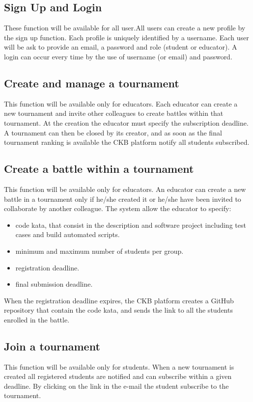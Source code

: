 \subsection{Sign Up and Login}
These function will be available for all user.\newline All users can create a new profile by the sign up function. Each profile is uniquely identified by a username. Each user will be ask to provide an email, a password and role (student or educator). \newline
A login can occur every time by the use of username (or email) and password.

\subsection{Create and manage a tournament}
This function will be available only for educators. \newline
Each educator can create a new tournament and invite other colleagues to create battles within that tournament. At the creation the educator must specify the subscription deadline. 
A tournament can then be closed by its creator, and as soon as the final tournament ranking is available the CKB platform notify all students subscribed.

\subsection{Create a battle within a tournament}
This function will be available only for educators. \newline 
An educator can create a new battle in a tournament only if he/she created it or he/she have been invited to collaborate by another colleague.
The system allow the educator to specify: 
\begin{itemize}
    \item code kata, that consist in the description and software project including test cases and build automated scripts.
    \item minimum and maximum number of students per group.
    \item registration deadline.
    \item final submission deadline.
\end{itemize}
When the registration deadline expires, the CKB platform creates a GitHub repository that contain the code kata, and sends the link to all the students enrolled in the battle.

\subsection{Join a tournament}
This function will be available only for students. \newline When a new tournament is created all registered students are notified and can subscribe within a given deadline.  By clicking on the link in the e-mail the student subscribe to the tournament.

